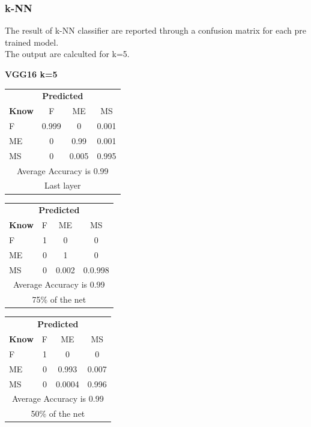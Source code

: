 \documentclass[12pt]{article} %
\begin{document}
\subsubsection {k-NN}
The result of k-NN classifier are reported through a confusion matrix for each pre trained model.\\
The output are calculted for k=5.\\
\begin{center}
\textbf{ VGG16 k=5}
\end{center}
\begin{minipage}{0.5\textwidth}
\begin{center}
\begin{tabular}{l|c|c|c|}
 \multicolumn{4}{c}{ \textbf{ Predicted}}\\
 \textbf{Know}&F&ME&MS\\ \hline\hline
F   &0.999&0&0.001\\
ME &0&0.99&0.001\\
MS &0&0.005&0.995\\
\multicolumn{4}{c}{Average Accuracy is 0.99}\\
\multicolumn{4}{c}{Last layer}\\
\end{tabular}
\end{center}
\end{minipage}
\begin{minipage}{0.5\textwidth}
\begin{center}
\begin{tabular}{l|c|c|c|}
 \multicolumn{4}{c}{ \textbf{ Predicted}}\\
 \textbf{Know}&F&ME&MS\\ \hline\hline
F   &1&0&0\\
ME &0&1&0\\
MS &0&0.002&0.0.998\\
\multicolumn{4}{c}{Average Accuracy is 0.99}\\
\multicolumn{4}{c}{75\%  of the net}\\
\end{tabular}
\end{center}
\end{minipage}
\begin{minipage}{0.5\textwidth}
\begin{center}
\begin{tabular}{l|c|c|c|}
 \multicolumn{4}{c}{ \textbf{ Predicted}}\\
 \textbf{Know}&F&ME&MS\\ \hline\hline
F   &1&0&0\\
ME &0&0.993&0.007\\
MS &0&0.0004&0.996\\
\multicolumn{4}{c}{Average Accuracy is 0.99}\\
\multicolumn{4}{c}{50\%  of the net}\\
\end{tabular}
\end{center}
\end{minipage}
\end{document}
